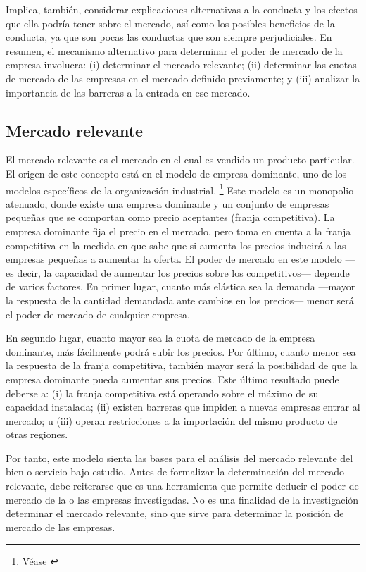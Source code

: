 \documentclass[
  12pt,
  spanish,
]{book}
\begin{document}
Implica, también, considerar explicaciones alternativas a la conducta y los efectos que ella podría tener sobre el mercado, así como los posibles beneficios de la conducta, ya que son pocas las conductas que son siempre perjudiciales. En resumen, el mecanismo alternativo para determinar el poder de mercado de la empresa involucra: (i) determinar el mercado relevante; (ii) determinar las cuotas de mercado de las empresas en el mercado
definido previamente; y (iii) analizar la importancia de las barreras a la entrada en ese mercado.

\hypertarget{mercado-relevante}{%
\subsection{Mercado relevante}\label{mercado-relevante}}

El mercado relevante es el mercado en el cual es vendido un producto particular. El origen de este concepto está en el modelo de empresa dominante, uno de los modelos específicos de la organización industrial.
\footnote{Véase \citet{Landes1981}}
Este modelo es un monopolio atenuado, donde existe una empresa dominante y un conjunto de empresas pequeñas que se comportan como precio aceptantes (franja competitiva). La empresa dominante fija el precio en el mercado, pero toma en cuenta a la franja competitiva en la medida en que sabe que si aumenta los precios inducirá a las empresas pequeñas a aumentar la oferta. El poder de mercado en este modelo ---es decir, la capacidad de aumentar los precios sobre los competitivos--- depende de varios factores. En primer lugar, cuanto más elástica sea la demanda ---mayor la respuesta de la cantidad demandada ante cambios en los precios--- menor será el poder de mercado de cualquier empresa.

En segundo lugar, cuanto mayor sea la cuota de mercado de la empresa dominante, más fácilmente podrá subir los precios. Por último, cuanto menor sea la respuesta de la franja competitiva, también mayor será la posibilidad de que la empresa dominante pueda aumentar sus precios. Este último resultado puede deberse a: (i) la franja competitiva está operando sobre el máximo de su capacidad instalada; (ii) existen barreras que impiden a nuevas empresas entrar al mercado; u (iii) operan restricciones a la importación del mismo producto de otras
regiones.

Por tanto, este modelo sienta las bases para el análisis del mercado relevante del bien o servicio bajo estudio.
Antes de formalizar la determinación del mercado relevante, debe reiterarse que es una herramienta que permite deducir el poder de mercado de la o las empresas investigadas. No es una finalidad de la investigación determinar el mercado relevante, sino que sirve para determinar la posición de mercado de las empresas.
\end{document}
